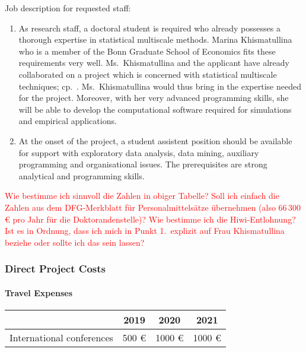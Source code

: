 \documentclass[a4paper,12pt]{article}
\begin{document}
\noindent Job description for requested staff: 
\begin{enumerate}[leftmargin=0.5cm]
\item As research staff, a doctoral student is required who already possesses a tho\-rough expertise in statistical multiscale methods. Marina Khismatullina who is a member of the Bonn Graduate School of Economics fits these requirements very well. Ms.\ Khismatullina and the applicant have already collaborated on a project which is concerned with statistical multiscale techniques; cp.\ \cite{KhismatullinaVogt2018}. Ms.\ Khismatullina would thus bring in the expertise needed for the project. Moreover, with her very advanced programming skills, she will be able to develop the computational software required for simulations and empirical applications. 
\item At the onset of the project, a student assistent position should be available for support with exploratory data analysis, data mining, auxiliary programming and organisational issues. The prerequisites are strong analytical and programming skills.
\end{enumerate}

\newpage
\noindent \textcolor{red}{Wie bestimme ich sinnvoll die Zahlen in obiger Tabelle? Soll ich einfach die Zahlen aus dem DFG-Merkblatt f\"ur Personalmittels\"atze \"ubernehmen (also $66 \, 300$ \euro{} pro Jahr f\"ur die Doktorandenstelle)? Wie bestimme ich die Hiwi-Entlohnung?} \\
\noindent \textcolor{red}{Ist es in Ordnung, dass ich mich in Punkt 1.\ explizit auf Frau Khismatullina beziehe oder sollte ich das sein lassen?}


\subsubsection{Direct Project Costs}


\paragraph{Travel Expenses}

\begin{center}
\begin{tabular}{l c c c}
 & 2019 & 2020 & 2021 \\
\hline 
International conferences & 500 \euro{} & 1000 \euro{} & 1000 \euro{} \\
\end{tabular}
\end{center}
\end{document}
